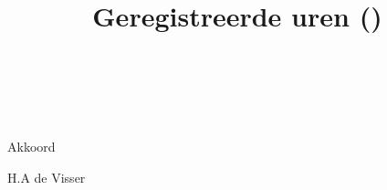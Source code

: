 \documentclass{memoir}
\title{Geregistreerde uren (\aboutmonth)}
\author{
    \fromname \\
    \fromaddress \\
    \ordernumber
}
\begin{document}
  \maketitle

  \urentable

  \vspace{1cm}

  Akkoord

  \vspace*{1.5cm}

  H.A de Visser
\end{document}

